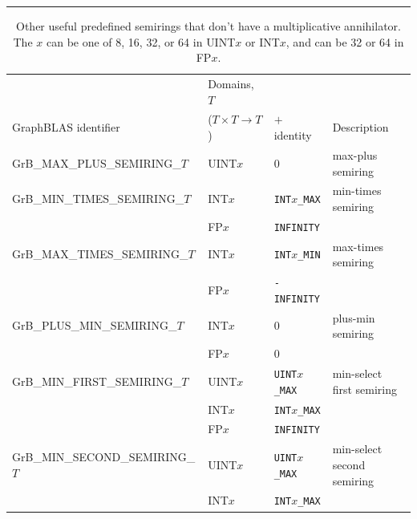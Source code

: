 \begin{table}
\centering
\begin{threeparttable}
\hrule
\caption{Other useful predefined semirings that don't have a multiplicative annihilator. 
The $x$ can be one of 8, 16, 32, or 64 in {\sf UINT$x$} or {\sf INT$x$}, 
and can be 32 or 64 in {\sf FP$x$}.}
\label{Tab:PredefinedUsefulSemirings}

\hspace*{-1.5em}
\begin{tabular}{l|l|l|l}
                                    & Domains, $T$             &            &                 \\
GraphBLAS identifier           & ($T \times T \rightarrow T$)  & $+$ identity      & Description             \\ \hline
{\sf GrB\_MAX\_PLUS\_SEMIRING\_$T$}   & {\sf UINT$x$}            & 0                 & max-plus semiring         \\
{\sf GrB\_MIN\_TIMES\_SEMIRING\_$T$}  & {\sf INT$x$}             & {\tt INT$x$\_MAX} & min-times semiring        \\
                                    & {\sf FP$x$}              & {\tt INFINITY}    &                  \\
{\sf GrB\_MAX\_TIMES\_SEMIRING\_$T$}  & {\sf INT$x$}             & {\tt INT$x$\_MIN} & max-times semiring        \\
                                    & {\sf FP$x$}              & {\tt -INFINITY}   &                 \\
{\sf GrB\_PLUS\_MIN\_SEMIRING\_$T$}   & {\sf INT$x$}             & 0                 & plus-min semiring          \\
                                    & {\sf FP$x$}              & 0                 &                 \\ 
{\sf GrB\_MIN\_FIRST\_SEMIRING\_$T$}  & {\sf UINT$x$}            & {\tt UINT$x$\_MAX}& min-select first  semiring     \\
                                    & {\sf INT$x$}             & {\tt INT$x$\_MAX} &                 \\
                                    & {\sf FP$x$}              & {\tt INFINITY}    &                 \\
{\sf GrB\_MIN\_SECOND\_SEMIRING\_$T$} & {\sf UINT$x$}            & {\tt UINT$x$\_MAX}& min-select second semiring     \\
                                    & {\sf INT$x$}             & {\tt INT$x$\_MAX} &                 \\

\end{tabular}
\end{threeparttable}
\end{table}
